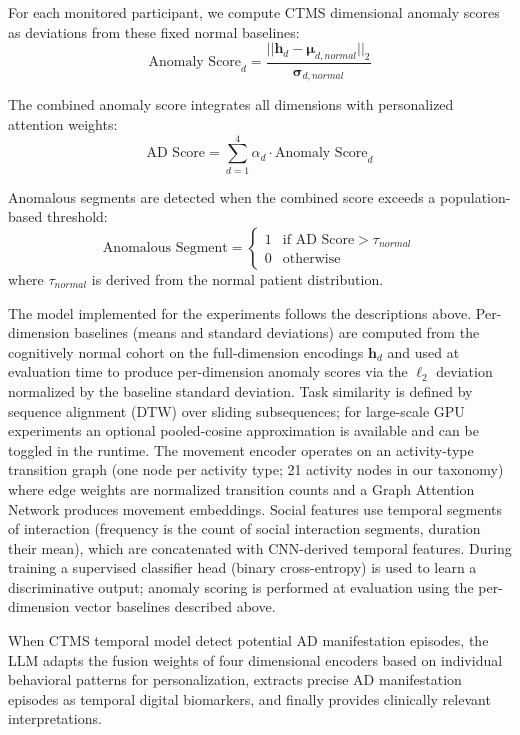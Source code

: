 \documentclass[sigconf, anonymous, 9pt, nonacm]{acmart}
\begin{document}
For each monitored participant, we compute CTMS dimensional anomaly scores as deviations from these fixed normal baselines:
\begin{equation*}
\text{Anomaly Score}_d = \frac{||\mathbf{h}_d - \boldsymbol{\mu}_{d,normal}||_2}{\boldsymbol{\sigma}_{d,normal}}
\end{equation*}

The combined anomaly score integrates all dimensions with personalized attention weights:
\begin{equation*}
\text{AD Score} = \sum_{d=1}^{4} \alpha_d \cdot \text{Anomaly Score}_d
\end{equation*}

Anomalous segments are detected when the combined score exceeds a population-based threshold:
\begin{equation*}
\text{Anomalous Segment} = \begin{cases}
1 & \text{if AD Score} > \tau_{normal} \\
0 & \text{otherwise}
\end{cases}
\end{equation*}
where $\tau_{normal}$ is derived from the normal patient distribution.

The model implemented for the experiments follows the descriptions above. Per-dimension baselines (means and standard deviations)
are computed from the cognitively normal cohort on the full-dimension encodings $\mathbf{h}_d$ and used at evaluation time to
produce per-dimension anomaly scores via the $\ell_2$ deviation normalized by the baseline standard deviation. Task similarity
is defined by sequence alignment (DTW) over sliding subsequences; for large-scale GPU experiments an optional pooled-cosine
approximation is available and can be toggled in the runtime. The movement encoder operates on an activity-type transition
graph (one node per activity type; 21 activity nodes in our taxonomy) where edge weights are normalized transition counts and a
Graph Attention Network produces movement embeddings. Social features use temporal segments of interaction (frequency is the
count of social interaction segments, duration their mean), which are concatenated with CNN-derived temporal features. During
training a supervised classifier head (binary cross-entropy) is used to learn a discriminative output; anomaly scoring is
performed at evaluation using the per-dimension vector baselines described above.

When CTMS temporal model detect potential AD manifestation episodes, the LLM adapts the fusion weights of four dimensional encoders based on individual behavioral patterns for personalization, extracts precise AD manifestation episodes as temporal digital biomarkers, and finally provides clinically relevant interpretations.
\end{document}
